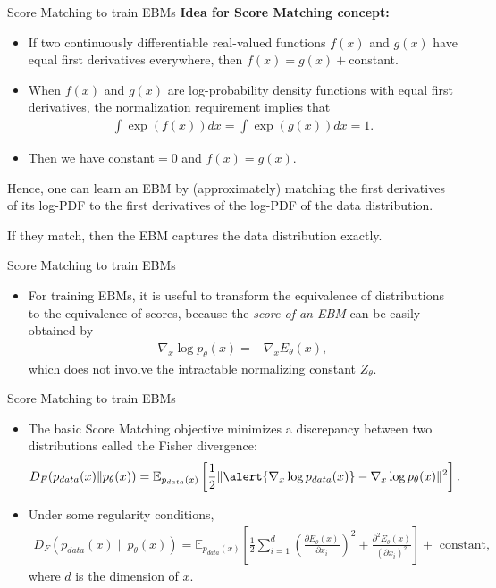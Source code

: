 \documentclass[aspectratio=169,xcolor=dvipsnames]{beamer}
\newcommand{\bE}{\mathbb{E}}
\newcommand{\te}{\theta}
\newcommand{\nal}[1]{\begin{align*}#1\end{align*}}
\begin{document}
\begin{frame}{Score Matching to train EBMs}
\textbf{Idea for Score Matching concept:}
\begin{itemize}
  \item If two continuously differentiable real-valued functions $f(x)$ and $g(x)$ have equal first derivatives everywhere, then $f(x)=g(x) + $constant.
  \item When \alert{$f(x)$ and $g(x)$ are log-probability density functions} with equal first derivatives, the normalization requirement implies that 
  \nal{
     \int \exp(f(x))dx = \int \exp(g(x))dx = 1.
  }
  \item Then we have constant$=0$ and $f(x)=g(x)$.
 \end{itemize}
 Hence,
 one can learn an EBM by (approximately) matching the first derivatives of its log-PDF to
 the first derivatives of the log-PDF of the data distribution. 
 
 If they match, then the EBM captures the data distribution exactly. 
\end{frame}


\begin{frame}{Score Matching to train EBMs}
\begin{itemize}
  \item For training EBMs, it is useful to transform the
 equivalence of distributions to the equivalence of scores, because the \textit{score of an EBM} can be
 easily obtained by 
 \nal{
    \nabla_x\log p_{\te}(x) = -\nabla_x E_{\te}(x),
 }
 which does not involve
 the intractable normalizing constant $Z_{\te}$.
 \end{itemize}
\end{frame}



\begin{frame}{Score Matching to train EBMs}
\begin{itemize}
  \item The basic Score Matching
  objective minimizes a discrepancy between two distributions called the Fisher divergence:
  \nal{
        D_F(p_{data}(x)\| p_{\te}(x)) = \bE_{p_{data}(x)}\left[\frac{1}{2}\|\alert{\nabla_x\log p_{data}(x)}-\nabla_x\log p_{\te}(x)\|^2\right].
  }
  \item Under some regularity conditions,
  \nal{
        D_F(p_{data}(x)\| p_{\te}(x)) = \bE_{p_{data}(x)}\left[\frac{1}{2}\sum\limits_{i=1}^{d}\left(\frac{\partial E_{\te}(x)}{\partial x_i}\right)^2 + \frac{\partial^2E_{\te}(x)}{(\partial x_i)^2} \right] + \text{ constant},
  }
  where $d$ is the dimension of $x$.
 \end{itemize}
\end{frame}
\end{document}

